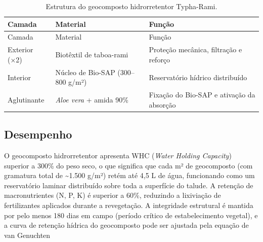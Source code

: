 \documentclass[
  portuguese,
  11pt,
  a4paper,
  open=any]{scrbook}
\begin{document}
\begin{longtable}[]{@{}
  >{\raggedright\arraybackslash}p{}
  >{\raggedright\arraybackslash}p{}
  >{\raggedright\arraybackslash}p{}@{}}
\caption{Estrutura do geocomposto hidrorretentor
Typha-Rami.}\label{tbl-geocomposto-hidro}\tabularnewline
\toprule\noalign{}
\begin{minipage}[b]{\linewidth}\raggedright
Camada
\end{minipage} & \begin{minipage}[b]{\linewidth}\raggedright
Material
\end{minipage} & \begin{minipage}[b]{\linewidth}\raggedright
Função
\end{minipage} \\
\midrule\noalign{}
\endfirsthead
\toprule\noalign{}
\begin{minipage}[b]{\linewidth}\raggedright
Camada
\end{minipage} & \begin{minipage}[b]{\linewidth}\raggedright
Material
\end{minipage} & \begin{minipage}[b]{\linewidth}\raggedright
Função
\end{minipage} \\
\midrule\noalign{}
\endhead
\bottomrule\noalign{}
\endlastfoot
Exterior (×2) & Biotêxtil de taboa-rami & Proteção mecânica, filtração e
reforço \\
Interior & Núcleo de Bio-SAP (300--800 g/m²) & Reservatório hídrico
distribuído \\
Aglutinante & \emph{Aloe vera} + amida 90\% & Fixação do Bio-SAP e
ativação da absorção \\
\end{longtable}

\subsection{Desempenho}\label{desempenho-1}

O geocomposto hidrorretentor apresenta WHC (\emph{Water Holding
Capacity}) superior a 300\% do peso seco, o que significa que cada m² de
geocomposto (com gramatura total de \textasciitilde1.500 g/m²) retém até
4,5 L de água, funcionando como um reservatório laminar distribuído
sobre toda a superfície do talude. A retenção de macronutrientes (N, P,
K) é superior a 60\%, reduzindo a lixiviação de fertilizantes aplicados
durante a revegetação. A integridade estrutural é mantida por pelo menos
180 dias em campo (período crítico de estabelecimento vegetal), e a
curva de retenção hídrica do geocomposto pode ser ajustada pela equação
de van Genuchten
\end{document}
